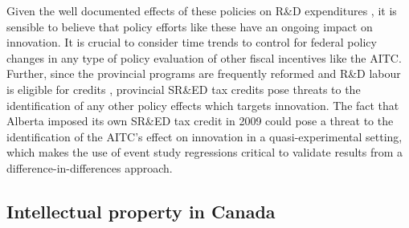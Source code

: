\documentclass[../main.tex]{subfiles}
\begin{document}
Given the well documented effects of these policies on R\&D expenditures \parencite{mansfield_switzer85b, agrawal_etal20, becker15}, it is sensible to believe that policy efforts like these have an ongoing impact on innovation. It is crucial to consider time trends to control for federal policy changes in any type of policy evaluation of other fiscal incentives like the AITC. Further, since the provincial programs are frequently reformed and R\&D labour is eligible for credits \parencite{mckenzie05}, provincial SR\&ED tax credits pose threats to the identification of any other policy effects which targets innovation. The fact that Alberta imposed its own SR\&ED tax credit in 2009 could pose a threat to the identification of the AITC's effect on innovation in a quasi-experimental setting, which makes the use of event study regressions critical to validate results from a difference-in-differences approach.

\subsection{Intellectual property in Canada}
\end{document}
